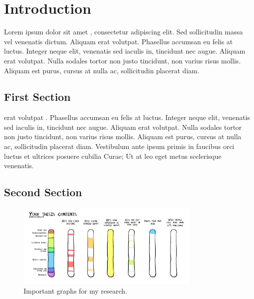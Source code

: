 \chapter{Introduction}

Lorem ipsum dolor sit amet \cite{smith2019title}, consectetur adipiscing elit. Sed sollicitudin massa vel venenatis dictum. Aliquam \cite{doe1515title} erat volutpat. Phasellus accumsan eu felis at luctus. Integer neque elit, venenatis sed iaculis in, tincidunt nec augue. Aliquam erat volutpat. Nulla sodales tortor non justo tincidunt, non varius risus mollis. Aliquam est purus, cursus at nulla ac, sollicitudin placerat diam. 

\section{First Section}
\citet{smith2020title} erat volutpat \citep{doe1515title}. Phasellus accumsan eu felis at luctus. Integer neque elit, venenatis sed iaculis in, tincidunt nec augue. Aliquam erat volutpat. Nulla sodales tortor non justo tincidunt, non varius risus mollis. Aliquam est purus, cursus at nulla ac, sollicitudin placerat diam. Vestibulum ante ipsum primis in faucibus orci luctus et ultrices posuere cubilia Curae; Ut at leo eget metus scelerisque venenatis.

\section{Second Section}

\begin{figure}[ht]
	\includegraphics[width=0.8\textwidth]{figures/Thesis-content.png}
	\centering
	\caption{Important graphs for my research.}
	\centering
	\label{fig:curve_fitting}
\end{figure}